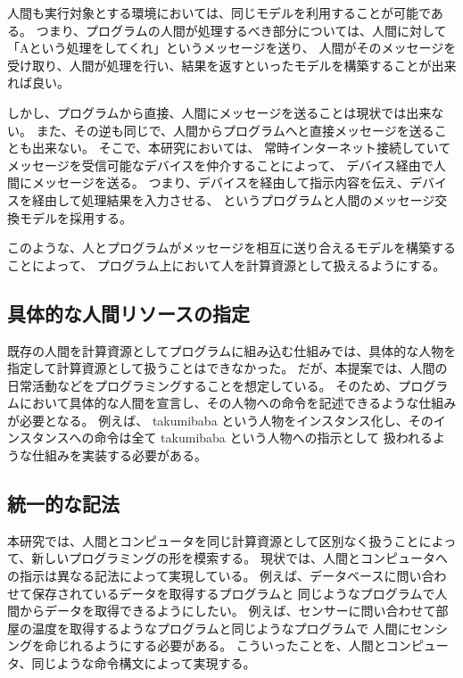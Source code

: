 人間も実行対象とする環境においては、同じモデルを利用することが可能である。
つまり、プログラムの人間が処理するべき部分については、人間に対して「Aという処理をしてくれ」というメッセージを送り、
人間がそのメッセージを受け取り、人間が処理を行い、結果を返すといったモデルを構築することが出来れば良い。

しかし、プログラムから直接、人間にメッセージを送ることは現状では出来ない。
また、その逆も同じで、人間からプログラムへと直接メッセージを送ることも出来ない。
そこで、本研究においては、
常時インターネット接続していてメッセージを受信可能なデバイスを仲介することによって、
デバイス経由で人間にメッセージを送る。
つまり、デバイスを経由して指示内容を伝え、デバイスを経由して処理結果を入力させる、
というプログラムと人間のメッセージ交換モデルを採用する。

このような、人とプログラムがメッセージを相互に送り合えるモデルを構築することによって、
プログラム上において人を計算資源として扱えるようにする。

\subsection{具体的な人間リソースの指定}\label{ux5177ux4f53ux7684ux306aux4ebaux9593ux30eaux30bdux30fcux30b9ux306eux6307ux5b9a}

既存の人間を計算資源としてプログラムに組み込む仕組みでは、具体的な人物を指定して計算資源として扱うことはできなかった。
だが、本提案では、人間の日常活動などをプログラミングすることを想定している。
そのため、プログラムにおいて具体的な人間を宣言し、その人物への命令を記述できるような仕組みが必要となる。
例えば、 takumibaba
という人物をインスタンス化し、そのインスタンスへの命令は全て takumibaba
という人物への指示として 扱われるような仕組みを実装する必要がある。

\subsection{統一的な記法}\label{ux7d71ux4e00ux7684ux306aux8a18ux6cd5}

本研究では、人間とコンピュータを同じ計算資源として区別なく扱うことによって、新しいプログラミングの形を模索する。
現状では、人間とコンピュータへの指示は異なる記法によって実現している。
例えば、データベースに問い合わせて保存されているデータを取得するプログラムと
同じようなプログラムで人間からデータを取得できるようにしたい。
例えば、センサーに問い合わせて部屋の温度を取得するようなプログラムと同じようなプログラムで
人間にセンシングを命じれるようにする必要がある。
こういったことを、人間とコンピュータ、同じような命令構文によって実現する。

